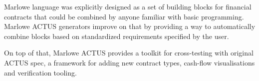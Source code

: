 \documentclass[runningheads]{llncs}
\begin{document}
Marlowe language was explicitly designed as a set of building blocks
for financial contracts that could be combined by anyone familiar
with basic programming. Marlowe ACTUS generators improve on that by
providing a way to automatically combine blocks based on standardized
requirements specified by the user.

On top of that, Marlowe ACTUS provides a toolkit for cross-testing
with original ACTUS spec, a framework for adding new contract types,
cash-flow visualisations and verification tooling.

%
%
%


%
\end{document}
